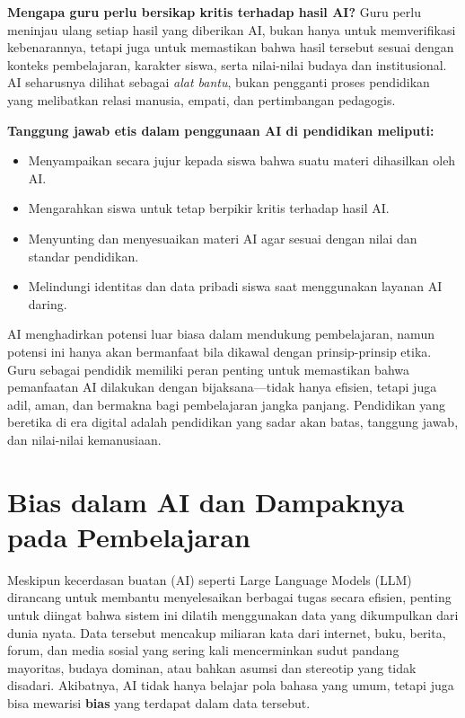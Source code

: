 \textbf{Mengapa guru perlu bersikap kritis terhadap hasil AI?}  
Guru perlu meninjau ulang setiap hasil yang diberikan AI, bukan hanya untuk memverifikasi kebenarannya, tetapi juga untuk memastikan bahwa hasil tersebut sesuai dengan konteks pembelajaran, karakter siswa, serta nilai-nilai budaya dan institusional. AI seharusnya dilihat sebagai \textit{alat bantu}, bukan pengganti proses pendidikan yang melibatkan relasi manusia, empati, dan pertimbangan pedagogis.

\textbf{Tanggung jawab etis dalam penggunaan AI di pendidikan meliputi:}
\begin{itemize}
	\item Menyampaikan secara jujur kepada siswa bahwa suatu materi dihasilkan oleh AI.
	\item Mengarahkan siswa untuk tetap berpikir kritis terhadap hasil AI.
	\item Menyunting dan menyesuaikan materi AI agar sesuai dengan nilai dan standar pendidikan.
	\item Melindungi identitas dan data pribadi siswa saat menggunakan layanan AI daring.
\end{itemize}

AI menghadirkan potensi luar biasa dalam mendukung pembelajaran, namun potensi ini hanya akan bermanfaat bila dikawal dengan prinsip-prinsip etika. Guru sebagai pendidik memiliki peran penting untuk memastikan bahwa pemanfaatan AI dilakukan dengan bijaksana—tidak hanya efisien, tetapi juga adil, aman, dan bermakna bagi pembelajaran jangka panjang. Pendidikan yang beretika di era digital adalah pendidikan yang sadar akan batas, tanggung jawab, dan nilai-nilai kemanusiaan.


\section{Bias dalam AI dan Dampaknya pada Pembelajaran}

Meskipun kecerdasan buatan (AI) seperti Large Language Models (LLM) dirancang untuk membantu menyelesaikan berbagai tugas secara efisien, penting untuk diingat bahwa sistem ini dilatih menggunakan data yang dikumpulkan dari dunia nyata. Data tersebut mencakup miliaran kata dari internet, buku, berita, forum, dan media sosial yang sering kali mencerminkan sudut pandang mayoritas, budaya dominan, atau bahkan asumsi dan stereotip yang tidak disadari. Akibatnya, AI tidak hanya belajar pola bahasa yang umum, tetapi juga bisa mewarisi \textbf{bias} yang terdapat dalam data tersebut.


